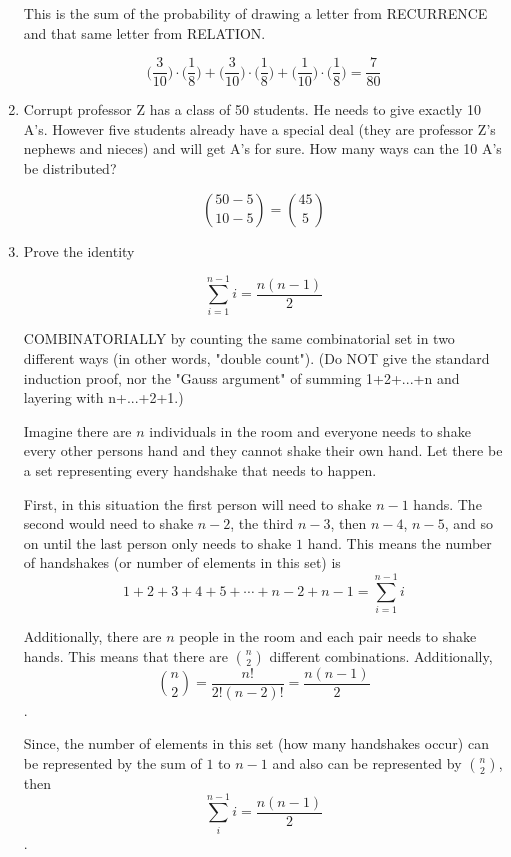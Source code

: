 \documentclass[12pt]{exam}
\begin{document}
\begin{enumerate}
This is the sum of the probability of drawing a letter from RECURRENCE and that same letter from RELATION. 

$$
\Bigg(\frac{3}{10}\Bigg) \cdot \Bigg(\frac{1}{8}\Bigg) + \Bigg(\frac{3}{10}\Bigg) \cdot \Bigg(\frac{1}{8}\Bigg) + \Bigg(\frac{1}{10}\Bigg) \cdot \Bigg(\frac{1}{8}\Bigg) = \frac{7}{80}
$$

\item Corrupt professor Z has a class of 50 students. He needs to give exactly 10 A's. However five students already have a special deal (they are professor Z's nephews and nieces) and will get A's for sure. How many ways can the 10 A's be distributed?

$$
\binom{50-5}{10-5} = \binom{45}{5}
$$

\item Prove the identity

$$\sum_{i=1}^{n-1} i = \frac{n(n - 1)}{2}$$

COMBINATORIALLY by counting the same combinatorial set in two different ways (in other words, "double count"). (Do NOT give the standard induction proof, nor the "Gauss argument" of summing 1+2+...+n and layering with n+...+2+1.)


Imagine there are $n$ individuals in the room and everyone needs to shake every other persons hand and they cannot shake their own hand. Let there be a set representing every handshake that needs to happen.

First, in this situation the first person will need to shake $n - 1$ hands. The second would need to shake $n - 2$, the third $n - 3$, then $n - 4$, $n - 5$, and so on until the last person only needs to shake $1$ hand. This means the number of handshakes (or number of elements in this set) is $$1 + 2 + 3 + 4 + 5 + \cdots + n - 2 + n - 1 = \sum_{i = 1}^{n - 1} i$$

Additionally, there are $n$ people in the room and each pair needs to shake hands. This means that there are $\binom{n}{2}$ different combinations. Additionally, $$\binom{n}{2} = \frac{n!}{2!(n - 2)!} = \frac{n(n - 1)}{2}$$. 

Since, the number of elements in this set (how many handshakes occur) can be represented by the sum of $1$ to $n - 1$ and also can be represented by $\binom{n}{2}$, then $$\sum_{i}^{n - 1} i = \frac{n(n - 1)}{2}$$. 

\end{enumerate}
\end{document}
